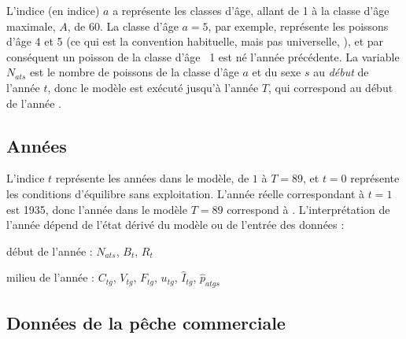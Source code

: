 \documentclass[11pt]{book}
\begin{document}
L'indice (en indice) $a$ a repr\'{e}sente les classes d'\^{a}ge, allant de 1 \`{a} la classe d'\^{a}ge maximale, $A$, de 60. 
La classe d'\^{a}ge $a=5$, par exemple, repr\'{e}sente les poissons d'\^{a}ge 4 et 5 (ce qui est la convention habituelle, mais pas universelle, \citealt{Caswell:2001}), et par cons\'{e}quent un poisson de la classe d'\^{a}ge ~1 est n\'{e} l'ann\'{e}e pr\'{e}c\'{e}dente.
La variable $N_{ats}$ est le nombre de poissons de la classe d'\^{a}ge $a$ et du sexe $s$ au \textit{d\'{e}but} de l'ann\'{e}e $t$, donc le mod\`{e}le est ex\'{e}cut\'{e} jusqu'\`{a} l'ann\'{e}e $T$, qui correspond au d\'{e}but de l'ann\'{e}e \finalYr.

\subsection{Ann\'{e}es}

L'indice $t$ repr\'{e}sente les ann\'{e}es dans le mod\`{e}le, de $1$ \`{a} $T=89$, et $t=0$ repr\'{e}sente les conditions d'\'{e}quilibre sans exploitation. 
L'ann\'{e}e r\'{e}elle correspondant \`{a} $t=1$ est 1935, donc l'ann\'{e}e dans le mod\`{e}le $T=89$ correspond \`{a} \finalYr.
L'interpr\'{e}tation de l'ann\'{e}e d\'{e}pend de l'\'{e}tat d\'{e}riv\'{e} du mod\`{e}le ou de l'entr\'{e}e des donn\'{e}es :
\begin{itemize_csas}{}{}
\item d\'{e}but de l'ann\'{e}e : $N_{ats}$, $B_t$, $R_t$
\item milieu de l'ann\'{e}e : $C_{tg}$, $V_{tg}$, $F_{tg}$, $u_{tg}$, $\widehat{I}_{tg}$, $\widehat{p}_{atgs}$
\end{itemize_csas}

\subsection{Donn\'{e}es de la p\^{e}che commerciale}
\end{document}
